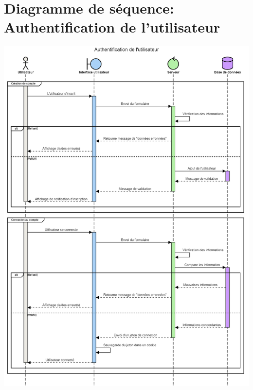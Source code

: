 \section{Diagramme de séquence: Authentification de l'utilisateur}
\label{Diagramme de séquence: Authentification de l'utilisateur}
\begin{center}
\includegraphics[width=\linewidth]{medias/seqAuth.png}
\end{center}


